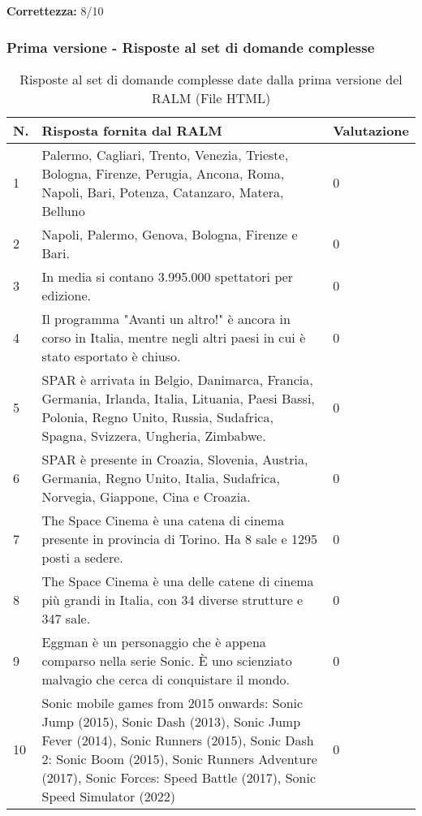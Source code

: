 \textbf{Correttezza:} 8/10

\subsubsection{Prima versione - Risposte al set di domande complesse}

\begin{table}[H]
    \centering
    \begin{tabular}{|p{0.5cm} |p{6cm} |p{2cm}|}
        \hline
        \textbf{N}. & \textbf{Risposta fornita dal RALM} & \textbf{Valutazione} \\
        \hline
        1 & Palermo, Cagliari, Trento, Venezia, Trieste, Bologna, Firenze, Perugia, Ancona, Roma, Napoli, Bari, Potenza, Catanzaro, Matera, Belluno & 0 \\
        \hline
        2 & Napoli, Palermo, Genova, Bologna, Firenze e Bari. & 0 \\
        \hline
        3 & In media si contano 3.995.000 spettatori per edizione. & 0 \\
        \hline
        4 & Il programma "Avanti un altro!" è ancora in corso in Italia, mentre negli altri paesi in cui è stato esportato è chiuso. & 0 \\
        \hline
        5 & SPAR è arrivata in Belgio, Danimarca, Francia, Germania, Irlanda, Italia, Lituania, Paesi Bassi, Polonia, Regno Unito, Russia, Sudafrica, Spagna, Svizzera, Ungheria, Zimbabwe. & 0 \\
        \hline
        6 & SPAR è presente in Croazia, Slovenia, Austria, Germania, Regno Unito, Italia, Sudafrica, Norvegia, Giappone, Cina e Croazia. & 0 \\
        \hline
        7 & The Space Cinema è una catena di cinema presente in provincia di Torino. Ha 8 sale e 1295 posti a sedere. & 0 \\
        \hline
        8 & The Space Cinema è una delle catene di cinema più grandi in Italia, con 34 diverse strutture e 347 sale.  & 0 \\
        \hline
        9 & Eggman è un personaggio che è appena comparso nella serie Sonic. È uno scienziato malvagio che cerca di conquistare il mondo. & 0 \\
        \hline
        10 & Sonic mobile games from 2015 onwards: Sonic Jump (2015), Sonic Dash (2013), Sonic Jump Fever (2014), Sonic Runners (2015), Sonic Dash 2: Sonic Boom (2015), Sonic Runners Adventure (2017), Sonic Forces: Speed Battle (2017), Sonic Speed Simulator (2022) & 0 \\
        \hline
    \end{tabular}
    \caption{Risposte al set di domande complesse date dalla prima versione del RALM (File HTML)}
\end{table}

